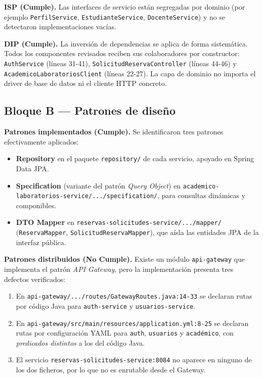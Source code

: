 \documentclass[11pt,a4paper]{article}
\begin{document}
\textbf{ISP (Cumple).} Las interfaces de servicio están segregadas por dominio
(por ejemplo \texttt{PerfilService}, \texttt{EstudianteService},
\texttt{DocenteService}) y no se detectaron implementaciones vacías.

\textbf{DIP (Cumple).} La inversión de dependencias se aplica de forma
sistemática. Todos los componentes revisados reciben sus colaboradores por
constructor: \texttt{AuthService} (líneas 31-41), \texttt{SolicitudReservaController}
(líneas 44-46) y \texttt{AcademicoLaboratoriosClient} (líneas 22-27). La capa
de dominio no importa el driver de base de datos ni el cliente HTTP concreto.

\subsection{Bloque B --- Patrones de diseño}

\textbf{Patrones implementados (Cumple).} Se identificaron tres patrones
efectivamente aplicados:

\begin{itemize}
  \item \textbf{Repository} en el paquete \texttt{repository/} de cada
        servicio, apoyado en Spring Data JPA.
  \item \textbf{Specification} (variante del patrón \emph{Query Object}) en
        \texttt{academico-laboratorios-service/.../specification/}, para
        consultas dinámicas y componibles.
  \item \textbf{DTO Mapper} en
        \texttt{reservas-solicitudes-service/.../mapper/}
        (\texttt{ReservaMapper}, \texttt{SolicitudReservaMapper}), que aísla
        las entidades JPA de la interfaz pública.
\end{itemize}

\textbf{Patrones distribuidos (No Cumple).} Existe un módulo \texttt{api-gateway}
que implementa el patrón \emph{API Gateway}, pero la implementación presenta
tres defectos verificados:

\begin{enumerate}
  \item En \texttt{api-gateway/.../routes/GatewayRoutes.java:14-33} se declaran
        rutas por código Java para \texttt{auth-service} y
        \texttt{usuarios-service}.
  \item En \texttt{api-gateway/src/main/resources/application.yml:8-25} se
        declaran rutas por configuración YAML para \texttt{auth},
        \texttt{usuarios} y \texttt{académico}, con \emph{predicados
        distintos} a los del código Java.
  \item El servicio \texttt{reservas-solicitudes-service:8084} no aparece en
        ninguno de los dos ficheros, por lo que no es enrutable desde el
        Gateway.
\end{enumerate}
\end{document}

